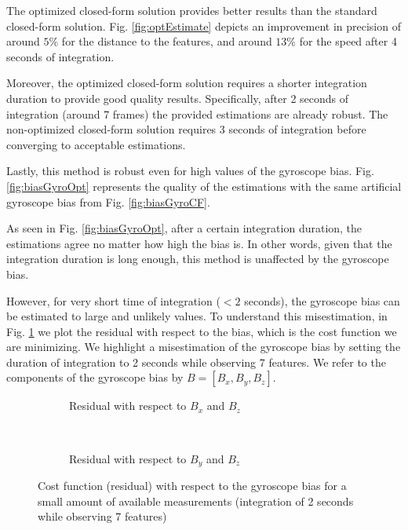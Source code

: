 \documentclass[letterpaper, 10 pt, conference]{ieeeconf}  %
\begin{document}
The optimized closed-form solution provides better results than the standard closed-form solution. Fig. \ref{fig:optEstimate} depicts an improvement in precision of around $5\%$ for the distance to the features, and around $13\%$ for the speed after 4 seconds of integration.

Moreover, the optimized closed-form solution requires a shorter integration duration to provide good quality results.
Specifically, after 2 seconds of integration (around 7 frames) the provided estimations are already robust.
The non-optimized closed-form solution requires 3 seconds of integration before converging to acceptable estimations.


Lastly, this method is robust even for high values of the gyroscope bias.
Fig. \ref{fig:biasGyroOpt} represents the quality of the estimations with the same artificial gyroscope bias from Fig. \ref{fig:biasGyroCF}.



As seen in Fig. \ref{fig:biasGyroOpt}, after a certain integration duration, the estimations agree no matter how high the bias is.
In other words, given that the integration duration is long enough, this method is unaffected by the gyroscope bias.

However, for very short time of integration ($<2$ seconds), the gyroscope bias can be estimated to large and unlikely values.
To understand this misestimation, in Fig. \ref{fig:cost} we plot the residual with respect to the bias, which is the cost function we are minimizing.
We highlight a misestimation of the gyroscope bias by setting the duration of integration to 2 seconds while observing 7 features.
We refer to the components of the gyroscope bias by $B = [B_x, B_y, B_z]$.

\begin{figure}
        \centering
        \begin{subfigure}[b]{0.47\columnwidth}
                \resizebox{\columnwidth}{!}{}
                \caption{Residual with respect to $B_x$ and $B_z$}
        \end{subfigure}~
        \begin{subfigure}[b]{0.47\columnwidth}
                \resizebox{\columnwidth}{!}{}
                \caption{Residual with respect to $B_y$ and $B_z$}
        \end{subfigure}
        \caption{Cost function (residual) with respect to the gyroscope bias for a small amount of available measurements (integration of 2 seconds while observing 7 features)\label{fig:cost}}
\end{figure}
\end{document}
